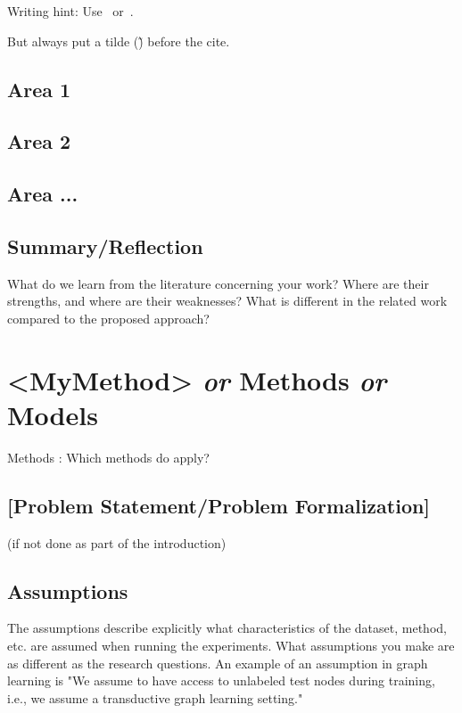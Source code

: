 \documentclass[sigconf, review, nonacm]{acmart}
\begin{document}
Writing hint:
%
Use~\cite{Abril07}
or~\citet{Abril07}.

But always put a tilde (\~) before the cite.

\subsection{Area 1}

\subsection{Area 2}

\subsection{Area ...}

\subsection{Summary/Reflection}

What do we learn from the literature concerning your work?
Where are their strengths, and where are their weaknesses?
What is different in the related work compared to the proposed approach?

\section{<MyMethod> \textit{or} Methods \textit{or} Models}
\label{sec:methods}

Methods : Which methods do apply?

\subsection{[Problem Statement/Problem Formalization]}
\label{sec:problemstatement}

(if not done as part of the introduction)

\subsection{Assumptions}

\begin{tcolorbox}
[title=Assumptions: What are assumptions?]
The assumptions describe explicitly what characteristics of the dataset, method, etc. are assumed when running the experiments. What assumptions you make are as different as the research questions. An example of an assumption in graph learning is "We assume to have access to unlabeled test nodes during training, i.e., we assume a transductive graph learning setting."
\end{tcolorbox}
\end{document}

